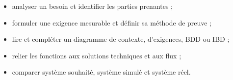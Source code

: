 \begin{savoirfaire}
\begin{itemize}
  \item analyser un besoin et identifier les parties prenantes ;
  \item formuler une exigence mesurable et définir sa méthode de preuve ;
  \item lire et compléter un diagramme de contexte, d'exigences, BDD ou IBD ;
  \item relier les fonctions aux solutions techniques et aux flux ;
  \item comparer système souhaité, système simulé et système réel.
\end{itemize}
\end{savoirfaire}





